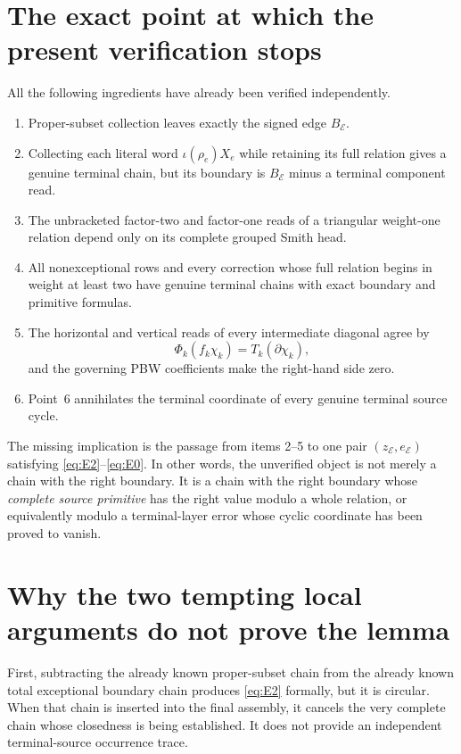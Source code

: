 \documentclass[11pt]{article}
\begin{document}
\section{The exact point at which the present verification stops}

All the following ingredients have already been verified independently.
\begin{enumerate}
\item Proper-subset collection leaves exactly the signed edge
      \(B_{\mathcal E}\).
\item Collecting each literal word \(\iota(\rho_e)X_e\) while retaining
      its full relation gives a genuine terminal chain, but its boundary is
      \(B_{\mathcal E}\) minus a terminal component read.
\item The unbracketed factor-two and factor-one reads of a triangular
      weight-one relation depend only on its complete grouped Smith head.
\item All nonexceptional rows and every correction whose full relation
      begins in weight at least two have genuine terminal chains with exact
      boundary and primitive formulas.
\item The horizontal and vertical reads of every intermediate diagonal
      agree by
      \[
          \Phi_k(f_k\chi_k)=T_k(\partial\chi_k),
      \]
      and the governing PBW coefficients make the right-hand side zero.
\item Point~6 annihilates the terminal coordinate of every genuine terminal
      source cycle.
\end{enumerate}

The missing implication is the passage from items 2--5 to one pair
\((z_{\mathcal E},e_{\mathcal E})\) satisfying
\eqref{eq:E2}--\eqref{eq:E0}.  In other words, the unverified object is not
merely a chain with the right boundary.  It is a chain with the right
boundary whose \emph{complete source primitive} has the right value modulo a
whole relation, or equivalently modulo a terminal-layer error whose cyclic
coordinate has been proved to vanish.

\section{Why the two tempting local arguments do not prove the lemma}

First, subtracting the already known proper-subset chain from the already
known total exceptional boundary chain produces \eqref{eq:E2} formally, but
it is circular.  When that chain is inserted into the final assembly, it
cancels the very complete chain whose closedness is being established.  It
does not provide an independent terminal-source occurrence trace.
\end{document}
